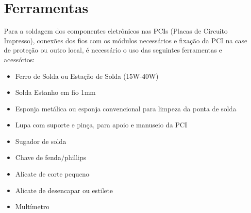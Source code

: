 









\section{Ferramentas}

\par Para a soldagem dos componentes eletrônicos nas PCIs (Placas de Circuito Impresso), conexões dos fios com os módulos necessários e fixação da PCI na case de proteção ou outro local, é necessário o uso das seguintes ferramentas e acessórios:

\begin{itemize}
    \item Ferro de Solda ou Estação de Solda (15W-40W)
    \item Solda Estanho em fio 1mm
    \item Esponja metálica ou esponja convencional para limpeza da ponta de solda
    \item Lupa com suporte e pinça, para apoio e manuseio da PCI
    \item Sugador de solda
    \item Chave de fenda/phillips
    \item Alicate de corte pequeno
    \item Alicate de desencapar ou estilete
    \item Multímetro
\end{itemize}

